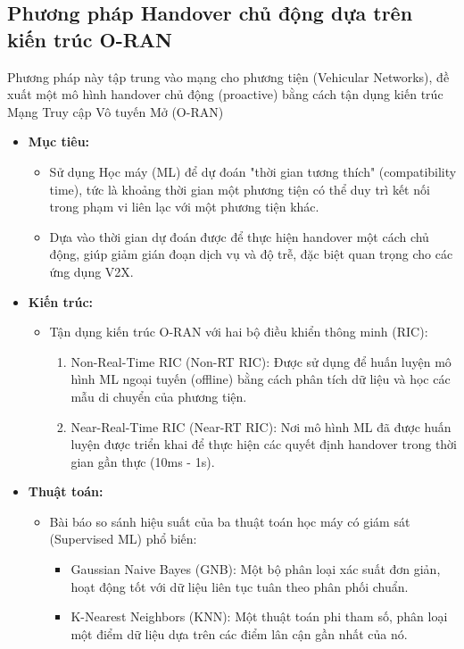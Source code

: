 \documentclass{article} %
\begin{document}
\subsection{Phương pháp Handover chủ động dựa trên kiến trúc O-RAN} \cite{rastogi2023intelligent}
Phương pháp này tập trung vào mạng cho phương tiện (Vehicular Networks), đề xuất một mô hình handover chủ động (proactive) bằng cách tận dụng kiến trúc Mạng Truy cập Vô tuyến Mở (O-RAN)
\begin{itemize}
    \item \textbf{Mục tiêu:}
    \begin{itemize}
        \item Sử dụng Học máy (ML) để dự đoán "thời gian tương thích" (compatibility time), tức là khoảng thời gian một phương tiện có thể duy trì kết nối trong phạm vi liên lạc với một phương tiện khác.
        \item Dựa vào thời gian dự đoán được để thực hiện handover một cách chủ động, giúp giảm gián đoạn dịch vụ và độ trễ, đặc biệt quan trọng cho các ứng dụng V2X.
    \end{itemize}
    \item \textbf{Kiến trúc:}
    \begin{itemize}
        \item Tận dụng kiến trúc O-RAN với hai bộ điều khiển thông minh (RIC):
        \begin{enumerate}
            \item Non-Real-Time RIC (Non-RT RIC): Được sử dụng để huấn luyện mô hình ML ngoại tuyến (offline) bằng cách phân tích dữ liệu và học các mẫu di chuyển của phương tiện.
            \item Near-Real-Time RIC (Near-RT RIC): Nơi mô hình ML đã được huấn luyện được triển khai để thực hiện các quyết định handover trong thời gian gần thực (10ms - 1s).
        \end{enumerate}
    \end{itemize}
    \item \textbf{Thuật toán:}
    \begin{itemize}
        \item Bài báo so sánh hiệu suất của ba thuật toán học máy có giám sát (Supervised ML) phổ biến:
        \begin{itemize}
            \item Gaussian Naive Bayes (GNB): Một bộ phân loại xác suất đơn giản, hoạt động tốt với dữ liệu liên tục tuân theo phân phối chuẩn.
            \item K-Nearest Neighbors (KNN): Một thuật toán phi tham số, phân loại một điểm dữ liệu dựa trên các điểm lân cận gần nhất của nó.

\end{itemize}
\end{itemize}
\end{itemize}
\end{document}
